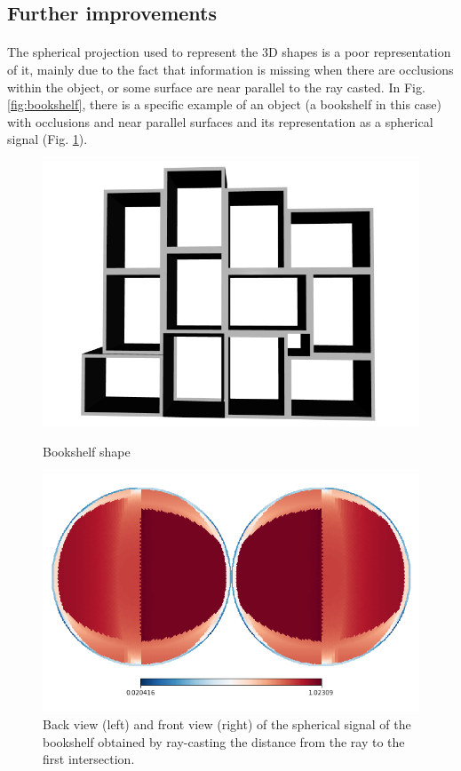 \documentclass[11pt]{report}
\begin{document}
\subsection{Further improvements}
\paragraph*{}
The spherical projection used to represent the 3D shapes is a poor representation of it, mainly due to the fact that information is missing when there are occlusions within the object, or some surface are near parallel to the ray casted. In Fig. \ref{fig:bookshelf}, there is a specific example of an object (a bookshelf in this case) with occlusions and near parallel surfaces and its representation as a spherical signal (Fig. \ref{fig:bookshelf_spherical}).

\begin{figure}[!ht]
\centering
\begin{minipage}{0.48\linewidth}
    \centering
    \includegraphics[width=0.8\linewidth]{bookshelf.png}
    \caption{Bookshelf shape}
    \label{fig:bookshelf}
\end{minipage}
\hfill
\begin{minipage}{0.48\linewidth}
    \centering
    \includegraphics[width=0.8\linewidth]{bookshelf_spherical.png}
    \caption{Back view (left) and front view (right) of the spherical signal of the bookshelf obtained by ray-casting the distance from the ray to the first intersection.}
    \label{fig:bookshelf_spherical}
\end{minipage}
\end{figure}
\end{document}
